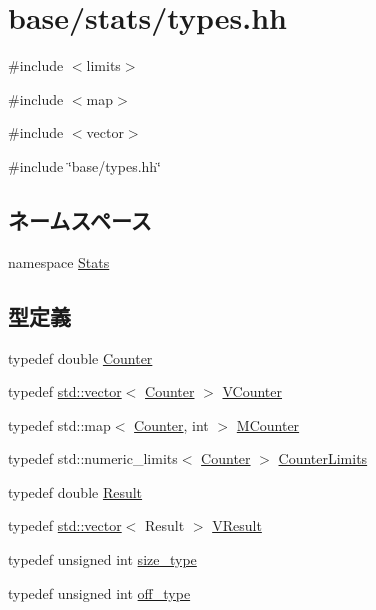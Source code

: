 \hypertarget{base_2stats_2types_8hh}{
\section{base/stats/types.hh}
\label{base_2stats_2types_8hh}
}
{\ttfamily \#include $<$limits$>$}\par
{\ttfamily \#include $<$map$>$}\par
{\ttfamily \#include $<$vector$>$}\par
{\ttfamily \#include \char`\"{}base/types.hh\char`\"{}}\par
\subsection*{ネームスペース}
\begin{DoxyCompactItemize}
\item 
namespace \hyperlink{namespaceStats}{Stats}
\end{DoxyCompactItemize}
\subsection*{型定義}
\begin{DoxyCompactItemize}
\item 
typedef double \hyperlink{namespaceStats_ac35128c026c72bb36af9cea00774e8a6}{Counter}
\item 
typedef \hyperlink{classstd_1_1vector}{std::vector}$<$ \hyperlink{base_2types_8hh_ae1475755791765b8e6f6a8bb091e273e}{Counter} $>$ \hyperlink{namespaceStats_a4f3db77b672fca87108b7ec51b7f22ec}{VCounter}
\item 
typedef std::map$<$ \hyperlink{base_2types_8hh_ae1475755791765b8e6f6a8bb091e273e}{Counter}, int $>$ \hyperlink{namespaceStats_a5a8433a643d3c7f0692fd273dcbe6423}{MCounter}
\item 
typedef std::numeric\_\-limits$<$ \hyperlink{base_2types_8hh_ae1475755791765b8e6f6a8bb091e273e}{Counter} $>$ \hyperlink{namespaceStats_a2527a6ff61a21b98505eb75fcda53749}{CounterLimits}
\item 
typedef double \hyperlink{namespaceStats_ad874d2cfd4b4a29ebd480bb2e67f20ae}{Result}
\item 
typedef \hyperlink{classstd_1_1vector}{std::vector}$<$ Result $>$ \hyperlink{namespaceStats_af863205b7357b2719d9821b5e5c897e1}{VResult}
\item 
typedef unsigned int \hyperlink{namespaceStats_ada51e68d31936547d3729c82daf6b7c6}{size\_\-type}
\item 
typedef unsigned int \hyperlink{namespaceStats_a2773c9fa9e4b0b04a46b37494b44842a}{off\_\-type}
\end{DoxyCompactItemize}
